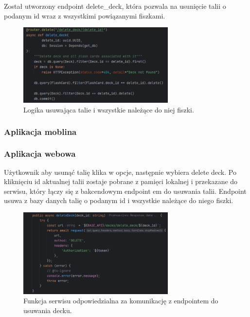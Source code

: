 Został utworzony endpoint delete_deck, która pozwala na usunięcie talii o podanym id wraz z wszystkimi powiązanymi fiszkami.

\begin{figure}[H]
    \centering
    \includegraphics[width=0.7\textwidth]{chapters/chapter_8/screens/delete_deck_backend}
    \caption{Logika usuwająca talie i wszystkie należące do niej fiszki.}
    \label{img:delete_deck_backend}
\end{figure}

\subsubsection{Aplikacja moblina}

\subsubsection{Aplikacja webowa}

Użytkownik aby usunąć talię klika w opcje, następnie wybiera delete deck. Po kliknięciu id aktualnej talii zostaje pobrane z pamięci lokalnej i przekazane do serwisu, który łączy się z bakcendowym endpoint em do usuwania talii. Endpoint usuwa z bazy danych talię o podanym id i wszystkie należące do niego fiszki.

\begin{figure}[H]
    \centering
    \includegraphics[width=0.7\textwidth]{chapters/chapter_8/screens/delete_deck_web}
    \caption{Funkcja serwisu odpowiedzialna za komunikację z endpointem do usuwania decku.}
    \label{img:delete_deck_web}
\end{figure}
